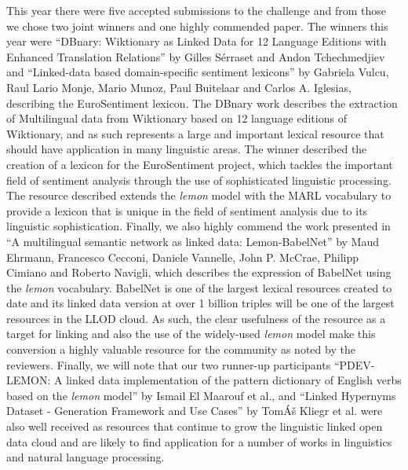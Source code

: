 \documentclass{article}
\begin{document}
\vspace{13pt}
\leftskip=0pt
\parindent=0pt
This year there were five accepted submissions to the challenge and from those 
we chose two joint winners and one highly commended paper. The winners this year 
were ``DBnary: Wiktionary as Linked Data for 12 Language Editions with Enhanced 
Translation Relations'' by Gilles Sérraset and Andon Tchechmedjiev and ``Linked-data 
based domain-specific sentiment lexicons'' by Gabriela Vulcu, Raul Lario Monje, 
Mario Munoz, Paul Buitelaar and Carlos A. Iglesias, describing the EuroSentiment 
lexicon. The DBnary work describes the extraction of Multilingual data from Wiktionary 
based on 12 language editions of Wiktionary, and as such represents a large and 
important lexical resource that should have application in many linguistic areas. 
The winner described the creation of a lexicon for the EuroSentiment project, which 
tackles the important field of sentiment analysis through the use of sophisticated 
linguistic processing. The resource described extends the \textit{lemon} model 
with the MARL vocabulary to provide a lexicon that is unique in the field of sentiment 
analysis due to its linguistic sophistication. Finally, we also highly commend 
the work presented in ``A multilingual semantic network as linked data: Lemon-BabelNet'' 
by Maud Ehrmann, Francesco Cecconi, Daniele Vannelle, John P. McCrae, Philipp Cimiano 
and Roberto Navigli, which describes the expression of BabelNet using the \textit{lemon} 
vocabulary. BabelNet is one of the largest lexical resources created to date and 
its linked data version at over 1 billion triples will be one of the largest resources 
in the LLOD cloud. As such, the clear usefulness of the resource as a target for 
linking and also the use of the widely-used \textit{lemon} model make this conversion 
a highly valuable resource for the community as noted by the reviewers. Finally, 
we will note that our two runner-up participants ``PDEV-LEMON: A linked data implementation 
of the pattern dictionary of English verbs based on the \textit{lemon} model'' 
by Ismail El Maarouf et al., and ``Linked Hypernyms Dataset - Generation Framework 
and Use Cases'' by TomÁš Kliegr et al. were also well received as resources that 
continue to grow the linguistic linked open data cloud and are likely to find application 
for a number of works in linguistics and natural language processing.

\newpage
\end{document}

